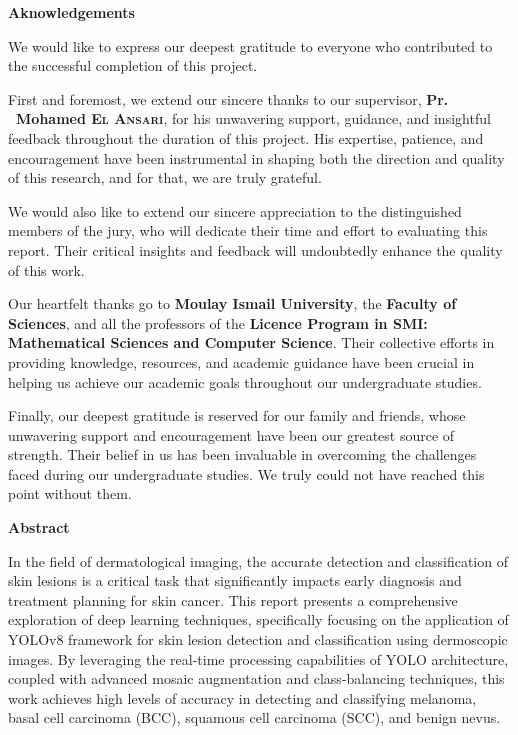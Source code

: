 \documentclass[a4paper,12pt]{report}
\begin{document}
\newpage
\begin{spacing}{1.5}
     \begin{center}
         \textbf{\huge Aknowledgements}
     \end{center}

    We would like to express our deepest gratitude to everyone who contributed to the successful completion of this project.

    First and foremost, we extend our sincere thanks to our supervisor, \textbf{Pr. ~Mohamed \textsc{El Ansari}}, for his unwavering support, guidance, and insightful feedback throughout the duration of this project. His expertise, patience, and encouragement have been instrumental in shaping both the direction and quality of this research, and for that, we are truly grateful.

    We would also like to extend our sincere appreciation to the distinguished members of the jury, who will dedicate their time and effort to evaluating this report. Their critical insights and feedback will undoubtedly enhance the quality of this work.

    Our  heartfelt thanks go to \textbf{Moulay Ismail University}, the \textbf{Faculty of Sciences}, and all the professors of the \textbf{Licence Program in SMI: Mathematical Sciences and Computer Science}. Their collective efforts in providing knowledge, resources, and academic guidance have been crucial in helping us achieve our academic goals throughout our undergraduate studies.

    Finally, our deepest gratitude is reserved for our family and friends, whose unwavering support and encouragement have been our greatest source of strength. Their belief in us has been invaluable in overcoming the challenges faced during our undergraduate studies. We truly could not have reached this point without them.

\newpage
\begin{center}
    \textbf{\huge Abstract}
\end{center}

    In the field of dermatological imaging, the accurate detection and classification of skin lesions is a critical task that significantly impacts early diagnosis and treatment planning for skin cancer. This report presents a comprehensive exploration of deep learning techniques, specifically focusing on the application of YOLOv8 framework for skin lesion detection and classification using dermoscopic images. By leveraging the real-time processing capabilities of YOLO architecture, coupled with advanced mosaic augmentation and class-balancing techniques, this work achieves high levels of accuracy in detecting and classifying melanoma, basal cell carcinoma (BCC), squamous cell carcinoma (SCC), and benign nevus.


\end{spacing}
\end{document}

